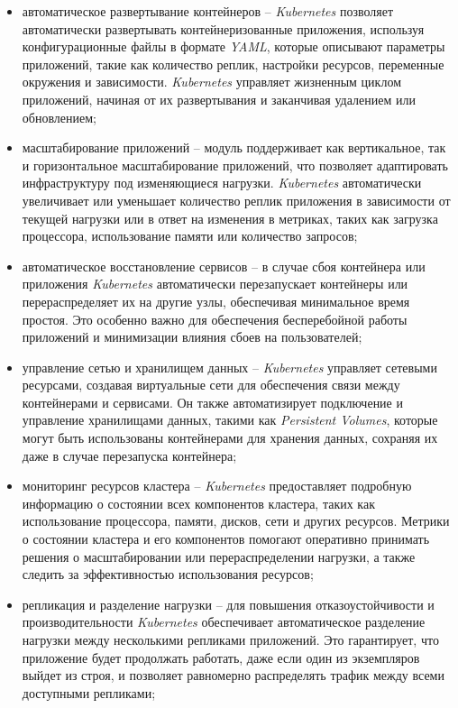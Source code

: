 \begin{itemize}
    \item автоматическое развертывание контейнеров -- \textit{Kubernetes} позволяет автоматически развертывать контейнеризованные приложения, используя конфигурационные файлы в формате \textit{YAML}, которые описывают параметры приложений, такие как количество реплик, настройки ресурсов, переменные окружения и зависимости. \textit{Kubernetes} управляет жизненным циклом приложений, начиная от их развертывания и заканчивая удалением или обновлением; 
    \item масштабирование приложений -- модуль поддерживает как вертикальное, так и горизонтальное масштабирование приложений, что позволяет адаптировать инфраструктуру под изменяющиеся нагрузки. \textit{Kubernetes} автоматически увеличивает или уменьшает количество реплик приложения в зависимости от текущей нагрузки или в ответ на изменения в метриках, таких как загрузка процессора, использование памяти или количество запросов;
    \item автоматическое восстановление сервисов -- в случае сбоя контейнера или приложения \textit{Kubernetes} автоматически перезапускает контейнеры или перераспределяет их на другие узлы, обеспечивая минимальное время простоя. Это особенно важно для обеспечения бесперебойной работы приложений и минимизации влияния сбоев на пользователей; 
    \item управление сетью и хранилищем данных -- \textit{Kubernetes} управляет сетевыми ресурсами, создавая виртуальные сети для обеспечения связи между контейнерами и сервисами. Он также автоматизирует подключение и управление хранилищами данных, такими как \textit{Persistent Volumes}, которые могут быть использованы контейнерами для хранения данных, сохраняя их даже в случае перезапуска контейнера;
    \item мониторинг ресурсов кластера -- \textit{Kubernetes} предоставляет подробную информацию о состоянии всех компонентов кластера, таких как использование процессора, памяти, дисков, сети и других ресурсов. Метрики о состоянии кластера и его компонентов помогают оперативно принимать решения о масштабировании или перераспределении нагрузки, а также следить за эффективностью использования ресурсов; 
    \item репликация и разделение нагрузки -- для повышения отказоустойчивости и производительности \textit{Kubernetes} обеспечивает автоматическое разделение нагрузки между несколькими репликами приложений. Это гарантирует, что приложение будет продолжать работать, даже если один из экземпляров выйдет из строя, и позволяет равномерно распределять трафик между всеми доступными репликами;

\end{itemize}
